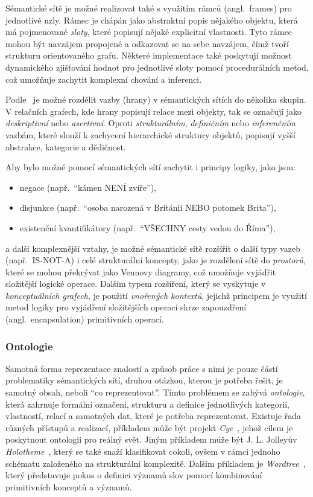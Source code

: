 Sémantické sítě je možné realizovat také s využitím rámců (angl.~frames) pro jednotlivé uzly.
Rámec je chápán jako abstraktní popis nějakého objektu, která má pojmenované \emph{sloty}, které popisují nějaké explicitní vlastnosti.
Tyto rámce mohou být navzájem propojené a odkazovat se na sebe navzájem, čímž tvoří strukturu orientovaného grafu.
Některé implementace také poskytují možnost dynamického zjišťování hodnot pro jednotlivé sloty pomocí procedurálních metod,
což umožňuje zachytit komplexní chování a inferenci.~\cite{semantic-nets-LEHMANN19921}

Podle~\cite{semantic-nets-LEHMANN19921} je možné rozdělit vazby (hrany) v sémantických sítích do několika skupin.
V relačních grafech, kde hrany popisují relace mezi objekty, tak se označují jako \emph{deskriptivní} nebo \emph{asertivní}.
Oproti \emph{strukturálním}, \emph{definičním} nebo \emph{inferenčním} vazbám, které slouží k zachycení hierarchické struktury objektů,
popisují vyšší abstrakce, kategorie a dědičnost.~\cite{semantic-nets-LEHMANN19921}

Aby bylo možné pomocí sémantických sítí zachytit i principy logiky, jako jsou:
\begin{itemize}
	\item negace (např.~\enquote{kámen NENÍ zvíře}),
	\item disjunkce (např.~\enquote{osoba narozená v Británii NEBO potomek Brita}),
	\item existenční kvantifikátory (např.~\enquote{VŠECHNY cesty vedou do Říma}),
\end{itemize}
a další komplexnější vztahy, je možné sémantické sítě rozšířit o další typy vazeb (např.~IS-NOT-A) i celé strukturální koncepty,
jako je rozdělení sítě do \emph{prostorů}, které se mohou překrývat jako Vennovy diagramy, což umožňuje vyjádřit složitější logické operace.
Dalším typem rozšíření, který se vyskytuje v \emph{konceptuálních grafech}, je použití \emph{vnořených kontextů},
jejichž principem je využití metod logiky pro vyjádření složitějších operací skrze zapouzdření (angl.~encapsulation) primitivních operací.
~\cite{semantic-nets-LEHMANN19921}

\subsubsection{Ontologie}
Samotná forma reprezentace znalostí a způsob práce s nimi je pouze částí problematiky sémantických sítí,
druhou otázkou, kterou je potřeba řešit, je samotný obsah, neboli \enquote{co reprezentovat}.
Tímto problémem se zabývá \emph{ontologie}, která zahrnuje formální označení, strukturu a definice jednotlivých kategorií,
vlastností, relací a samotných dat, které je potřeba reprezentovat.
Existuje řada různých přístupů a realizací, příkladem může být projekt \emph{Cyc}~\cite{cyc}, jehož cílem je poskytnout ontologii pro reálný svět.
Jiným příkladem může být J. L. Jolleyův \emph{Holotheme}~\cite{jolley1971holotheme}, který se také snaží klasifikovat cokoli,
ovšem v rámci jednoho schématu založeného na strukturální komplexitě.
Dalším příkladem je \emph{Wordtree}~\cite{burger1984wordtree}, který představuje pokus o definici významů slov pomocí kombinování primitivních konceptů a významů.~\cite{semantic-nets-LEHMANN19921}
